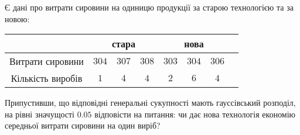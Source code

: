 \begin{example}
    Є дані про витрати сировини на одиницю продукції за старою технологією та за новою:
    \begin{center}
        \begin{tabular}{|c|c|c|c|c|c|c|c|}
            \hline
            {} & \multicolumn{3}{c|}{стара} & \multicolumn{3}{c|}{нова} \\
            \hline
            Витрати сировини & $304$ & $307$ & $308$ & $303$ & $304$ & $306$ \\
            \hline
            Кількість виробів & $1$ & $4$ & $4$ & $2$ & $6$ & $4$ \\
            \hline
        \end{tabular}
    \end{center}
    Припустивши, що відповідні генеральні сукупності мають гауссівський розподіл, 
    на рівні значущості $0.05$ відповісти на питання: чи дає нова технологія 
    економію середньої витрати сировини на один виріб?


\end{example}
